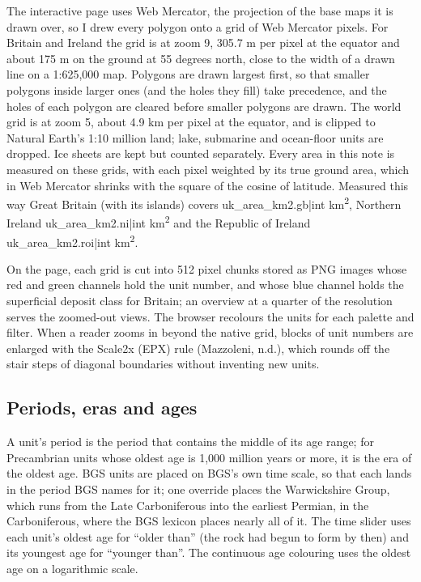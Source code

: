 \documentclass[11pt,a4paper]{article}
\begin{document}
The interactive page uses Web Mercator, the projection of the base maps it is drawn over, so I drew every polygon onto a grid of Web Mercator pixels. For Britain and Ireland the grid is at zoom 9, 305.7 m per pixel at the equator and about 175 m on the ground at 55 degrees north, close to the width of a drawn line on a 1:625,000 map. Polygons are drawn largest first, so that smaller polygons inside larger ones (and the holes they fill) take precedence, and the holes of each polygon are cleared before smaller polygons are drawn. The world grid is at zoom 5, about 4.9 km per pixel at the equator, and is clipped to Natural Earth's 1:10 million land; lake, submarine and ocean-floor units are dropped. Ice sheets are kept but counted separately. Every area in this note is measured on these grids, with each pixel weighted by its true ground area, which in Web Mercator shrinks with the square of the cosine of latitude. Measured this way Great Britain (with its islands) covers {{uk_area_km2.gb|int}} km\textsuperscript{2}, Northern Ireland {{uk_area_km2.ni|int}} km\textsuperscript{2} and the Republic of Ireland {{uk_area_km2.roi|int}} km\textsuperscript{2}.

On the page, each grid is cut into 512 pixel chunks stored as PNG images whose red and green channels hold the unit number, and whose blue channel holds the superficial deposit class for Britain; an overview at a quarter of the resolution serves the zoomed-out views. The browser recolours the units for each palette and filter. When a reader zooms in beyond the native grid, blocks of unit numbers are enlarged with the Scale2x (EPX) rule (Mazzoleni, n.d.), which rounds off the stair steps of diagonal boundaries without inventing new units.

\subsection{Periods, eras and ages}

A unit's period is the period that contains the middle of its age range; for Precambrian units whose oldest age is 1,000 million years or more, it is the era of the oldest age. BGS units are placed on BGS's own time scale, so that each lands in the period BGS names for it; one override places the Warwickshire Group, which runs from the Late Carboniferous into the earliest Permian, in the Carboniferous, where the BGS lexicon places nearly all of it. The time slider uses each unit's oldest age for ``older than'' (the rock had begun to form by then) and its youngest age for ``younger than''. The continuous age colouring uses the oldest age on a logarithmic scale.
\end{document}
